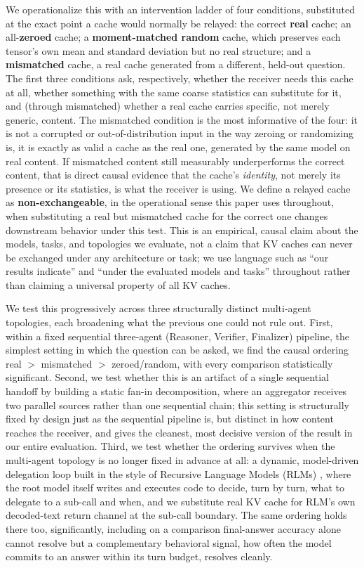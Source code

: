 \documentclass[11pt]{article}
\begin{document}
We operationalize this with an intervention ladder of four conditions,
substituted at the exact point a cache would normally be relayed: the
correct \textbf{real} cache; an all-\textbf{zeroed} cache; a
\textbf{moment-matched random} cache, which preserves each tensor's own
mean and standard deviation but no real structure; and a \textbf{mismatched}
cache, a real cache generated from a different, held-out question. The
first three conditions ask, respectively, whether the receiver needs this
cache at all, whether something with the same coarse statistics can
substitute for it, and (through mismatched) whether a real cache carries
specific, not merely generic, content. The mismatched condition is the
most informative of the four: it is not a corrupted or out-of-distribution
input in the way zeroing or randomizing is, it is exactly as valid a cache
as the real one, generated by the same model on real content. If mismatched
content still measurably underperforms the correct content, that is direct
causal evidence that the cache's \emph{identity}, not merely its presence
or its statistics, is what the receiver is using. We define a relayed cache
as \textbf{non-exchangeable}, in the operational sense this paper uses
throughout, when substituting a real but mismatched cache for the correct
one changes downstream behavior under this test. This is an empirical,
causal claim about the models, tasks, and topologies we evaluate, not a
claim that KV caches can never be exchanged under any architecture or
task; we use language such as ``our results indicate'' and ``under the
evaluated models and tasks'' throughout rather than claiming a universal
property of all KV caches.

We test this progressively across three structurally distinct multi-agent
topologies, each broadening what the previous one could not rule out.
First, within a fixed sequential three-agent (Reasoner, Verifier,
Finalizer) pipeline, the simplest setting in which the question can be
asked, we find the causal ordering real $>$ mismatched $>$ zeroed/random,
with every comparison statistically significant. Second, we test whether
this is an artifact of a single sequential handoff by building a static
fan-in decomposition, where an aggregator receives two parallel sources
rather than one sequential chain; this setting is structurally fixed by
design just as the sequential pipeline is, but distinct in how content
reaches the receiver, and gives the cleanest, most decisive version of the
result in our entire evaluation. Third, we test whether the ordering
survives when the multi-agent topology is no longer fixed in advance at
all: a dynamic, model-driven delegation loop built in the style of
Recursive Language Models (RLMs) \citep{rlm2026}, where the root model
itself writes and executes code to decide, turn by turn, what to delegate
to a sub-call and when, and we substitute real KV cache for RLM's own
decoded-text return channel at the sub-call boundary. The same ordering
holds there too, significantly, including on a comparison final-answer
accuracy alone cannot resolve but a complementary behavioral signal, how
often the model commits to an answer within its turn budget, resolves
cleanly.
\end{document}
